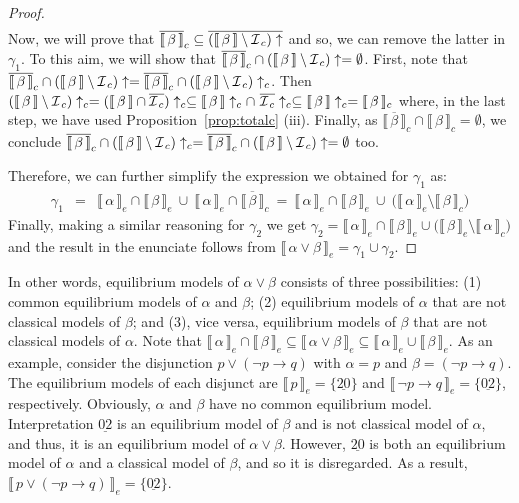 \documentclass{tlp}
\def\cIc{{\cal I}_{\, c}}
\def\up{\uparrow}
\newcommand\non[1]{\overline{#1} }
\newcommand{\den}[1]{\llbracket \, #1 \, \rrbracket}
\newcommand{\str}[1]{\underline{#1}}
\begin{document}
\begin{proof}
\begin{eqnarray*}
 \end{eqnarray*}
Now, we will prove that $\non{\den{\beta}}_c \subseteq \non{(\den{\beta} \setminus \cIc) \up}$ and so, we can remove the latter in $\gamma_1$. To this aim, we will show that $\non{\den{\beta}}_c \cap (\den{\beta} \setminus \cIc) \up =\emptyset$. First, note that $\non{\den{\beta}}_c \cap (\den{\beta} \setminus \cIc) \up = \non{\den{\beta}}_c \cap (\den{\beta} \setminus \cIc) \up_c$. Then $(\den{\beta} \setminus \cIc) \up_c = (\den{\beta} \cap \non{\cIc}) \up_c \subseteq \den{\beta}\up_c \cap\ \non{\cIc} \up_c \subseteq \den{\beta}\up_c = \den{\beta}_c$ where, in the last step, we have used Proposition~\ref{prop:totalc} (iii). Finally, as $\non{\den{\beta}}_c \cap \den{\beta}_c = \emptyset$, we conclude $\non{\den{\beta}}_c \cap (\den{\beta} \setminus \cIc) \up_c = \non{\den{\beta}}_c \cap (\den{\beta} \setminus \cIc) \up= \emptyset$ too.

Therefore, we can further simplify the expression we obtained for $\gamma_1$ as:
\begin{eqnarray*}
\gamma_1 & = & \den{\alpha}_e \cap \den{\beta}_e \ \cup \ \den{\alpha}_e \cap \non{\den{\beta}}_c \ = \ 
 \den{\alpha}_e \cap \den{\beta}_e \ \cup \ \big(\den{\alpha}_e \setminus \den{\beta}_c\big)
\end{eqnarray*}
Finally, making a similar reasoning for $\gamma_2$ we get $\gamma_2= \den{\alpha}_e \cap \den{\beta}_e \cup \big(\den{\beta}_e \setminus \den{\alpha}_c\big)$ and the result in the enunciate follows from $\den{\alpha\vee \beta}_e = \gamma_1 \cup \gamma_2$.
\end{proof}


\noindent In other words, equilibrium models of $\alpha \vee \beta$ consists of three possibilities: (1) common equilibrium models of $\alpha$ and $\beta$; (2) equilibrium models of $\alpha$ that are not classical models of $\beta$; and (3), vice versa, equilibrium models of $\beta$ that are not classical models of $\alpha$. Note that $\den{\alpha}_e \cap \den{\beta}_e \subseteq \den{\alpha \vee \beta}_e \subseteq \den{\alpha}_e \cup \den{\beta}_e$. As an example, consider the disjunction $p \vee (\neg p \rightarrow q)$ with $\alpha=p$ and $\beta=(\neg p \rightarrow q)$. The equilibrium models of each disjunct are $\den{p}_e=\{\str{20}\}$ and $\den{\neg p \rightarrow q}_e = \{\str{02}\}$, respectively. Obviously, $\alpha$ and $\beta$ have no common equilibrium model. Interpretation $\str{02}$ is an equilibrium model of $\beta$ and is not classical model of $\alpha$, and thus, it is an equilibrium model of $\alpha \vee \beta$. However, $\str{20}$ is both an equilibrium model of $\alpha$ and a classical model of $\beta$, and so it is disregarded. As a result, $\den{p \vee (\neg p \rightarrow q)}_e=\{\str{02}\}$.
\end{document}
